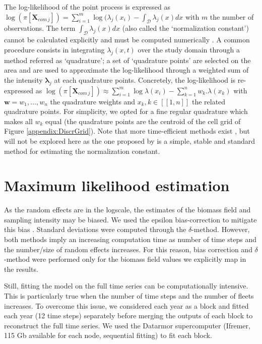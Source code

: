 The log-likelihood of the point process is expressed as $\log (\pi[ \mathbf{X}_{com \, j} ]) = \sum_{i=1}^m \log ( \lambda_j ( x_i ) - \int_\mathcal{D} \lambda_j (x) dx$ with $m$ the number of observations. The term $\int_\mathcal{D} \lambda_j (x) dx$ (also called the ‘normalization constant’) cannot be calculated explicitly and must be computed numerically \parencite{renner-point-2015}. A common procedure consists in integrating $\lambda_j (x,t)$ over the study domain through a method referred as ‘quadrature’; a set of ‘quadrature points’ are selected on the area and are used to approximate the log-likelihood through a weighted sum of the intensity $\boldsymbol{\lambda}_j$ at each quadrature points. Concretely, the log-likelihood is re-expressed as $\log (\pi[\mathbf{X}_{com \, j} ]) \approx \sum_{i=1}^m \log \lambda( x_i ) -\sum_{k=1}^n w_k . \lambda( x_k )$ with $\mathbf{w}={w_1,...,w_n}$ the quadrature weights and $x_k, k \in [\![1,n]\!]$ the related quadrature points. For simplicity, we opted for a fine regular quadrature which makes all $w_k$ equal (the quadrature points are the centroid of the cell grid of Figure \ref{appendix:DiscrGrid}). Note that more time-efficient methods exist \parencite{jullum-investigating-2020,simpson-going-2016}, but will not be explored here as the one proposed by \textcite{renner-point-2015} is a simple, stable and standard method for estimating the normalization constant.

\section{Maximum likelihood estimation}\label{appendix:MaxLikEst}

As the random effects are in the logscale, the estimates of the biomass field and sampling intensity may be biased. We used the epsilon bias-correction to mitigate this bias \parencite{thorson-implementing-2016}. Standard deviations were computed through the $\delta$-method. However, both methods imply an increasing computation time as number of time steps and the number/size of random effects increases. For this reason, bias correction and $\delta$-method were performed only for the biomass field values we explicitly map in the results.

Still, fitting the model on the full time series can be computationally intensive. This is particularly true when the number of time steps and the number of fleets increases. To overcome this issue, we considered each year as a block and fitted each year (12 time steps) separately before merging the outputs of each block to reconstruct the full time series. We used the Datarmor supercomputer (Ifremer, 115 Gb available for each node, sequential fitting) to fit each block.

